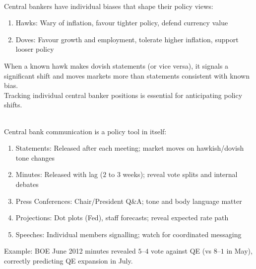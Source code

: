 \begin{remark} \\
Central bankers have individual biases that shape their policy views:
\begin{enumerate}[label=\roman*.]
\setlength{\itemsep}{0pt}
\item Hawks: Wary of inflation, favour tighter policy, defend currency value
\item Doves: Favour growth and employment, tolerate higher inflation, support looser policy
\end{enumerate}
When a known hawk makes dovish statements (or vice versa), it signals a significant shift and moves markets more than statements consistent with known bias.\\
Tracking individual central banker positions is essential for anticipating policy shifts.
\end{remark}

\begin{remark} \\
Central bank communication is a policy tool in itself:
\begin{enumerate}[label=\roman*.]
\setlength{\itemsep}{0pt}
\item Statements: Released after each meeting; market moves on hawkish/dovish tone changes
\item Minutes: Released with lag ($2$ to $3$ weeks); reveal vote splits and internal debates
\item Press Conferences: Chair/President Q\&A; tone and body language matter
\item Projections: Dot plots (Fed), staff forecasts; reveal expected rate path
\item Speeches: Individual members signalling; watch for coordinated messaging
\end{enumerate}
Example: BOE June 2012 minutes revealed $5$--$4$ vote against QE (vs $8$--$1$ in May), correctly predicting QE expansion in July.
\end{remark}

